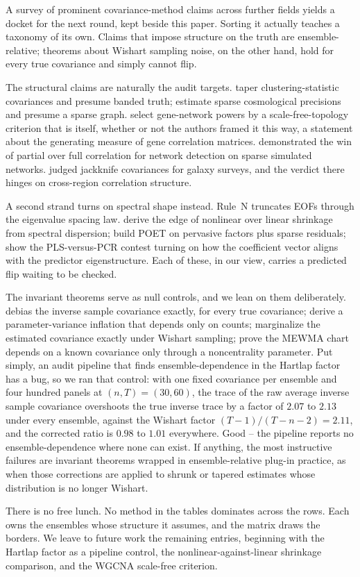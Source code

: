 \documentclass[11pt]{article}
\begin{document}
A survey of prominent covariance-method claims across further fields
yields a docket for the next round, kept beside this paper. Sorting it
actually teaches a taxonomy of its own. Claims that impose structure on the truth are
ensemble-relative; theorems about Wishart sampling noise, on the other hand, hold for
every true covariance and simply cannot flip.

The structural claims are naturally the audit targets. \citet{paz2015} taper clustering-statistic covariances and presume banded truth;
\citet{padmanabhan2016} estimate sparse cosmological precisions and
presume a sparse graph. \citet{zhang2005} select gene-network
powers by a scale-free-topology criterion that is itself, whether or not the authors framed it this way,
a statement about the generating measure of gene correlation matrices. \citet{smith2011} demonstrated the win of partial over full correlation for network
detection on sparse simulated networks. \citet{norberg2009} judged
jackknife covariances for galaxy surveys, and the verdict there hinges on
cross-region correlation structure.

A second strand turns on spectral shape instead. Rule~N \citep{preisendorfer1988}
truncates EOFs through the eigenvalue spacing law. \citet{ledoit2012} derive the edge of nonlinear over linear shrinkage from spectral
dispersion; \citet{fan2013} build POET on pervasive
factors plus sparse residuals; \citet{frank1993} show the
PLS-versus-PCR contest turning on how the coefficient vector aligns with
the predictor eigenstructure. Each of these, in our view, carries a predicted flip waiting to be checked.

The invariant theorems serve as null controls, and we lean on them deliberately. \citet{hartlap2007}
debias the inverse sample covariance exactly, for every
true covariance; \citet{dodelson2013} derive a
parameter-variance inflation that depends only on counts; \citet{sellentin2016} marginalize the estimated covariance exactly under
Wishart sampling; \citet{lowry1992} prove the MEWMA chart depends on
a known covariance only through a noncentrality parameter. Put simply, an audit
pipeline that finds ensemble-dependence in the Hartlap factor has a bug,
so we ran that control: with one fixed covariance per ensemble and four
hundred panels at $(n,T)=(30,60)$, the trace of the raw average inverse
sample covariance overshoots the true inverse trace by a factor of
$2.07$ to $2.13$ under every ensemble, against the Wishart factor
$(T-1)/(T-n-2)=2.11$, and the corrected ratio is $0.98$ to $1.01$
everywhere. Good -- the pipeline reports no ensemble-dependence where none can
exist. If anything, the most instructive failures are invariant theorems wrapped in
ensemble-relative plug-in practice, as when those corrections are
applied to shrunk or tapered estimates whose distribution is no longer
Wishart.

There is no free lunch. No method in the tables dominates across the rows. Each owns the
ensembles whose structure it assumes, and the matrix draws the borders.
We leave to future work the remaining entries, beginning with the
Hartlap factor as a pipeline control, the nonlinear-against-linear
shrinkage comparison, and the WGCNA scale-free criterion.



\end{document}
